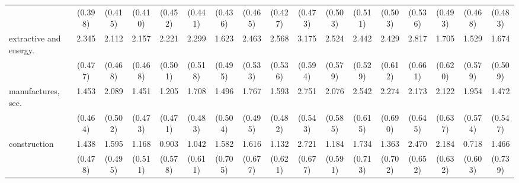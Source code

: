{\begin{tabular}{l*{16}{c}}
                    &     (0.398)         &     (0.415)         &     (0.410)         &     (0.452)         &     (0.441)         &     (0.436)         &     (0.465)         &     (0.427)         &     (0.473)         &     (0.503)         &     (0.511)         &     (0.503)         &     (0.536)         &     (0.493)         &     (0.468)         &     (0.483)         \\
[1em]
extractive and energy.&       2.345\sym{***}&       2.112\sym{***}&       2.157\sym{***}&       2.221\sym{***}&       2.299\sym{***}&       1.623\sym{**} &       2.463\sym{***}&       2.568\sym{***}&       3.175\sym{***}&       2.524\sym{***}&       2.442\sym{***}&       2.429\sym{***}&       2.817\sym{***}&       1.705\sym{**} &       1.529\sym{**} &       1.674\sym{**} \\
                    &     (0.477)         &     (0.468)         &     (0.468)         &     (0.501)         &     (0.518)         &     (0.495)         &     (0.533)         &     (0.536)         &     (0.594)         &     (0.579)         &     (0.529)         &     (0.612)         &     (0.661)         &     (0.620)         &     (0.579)         &     (0.509)         \\
[1em]
manufactures, sec.  &       1.453\sym{**} &       2.089\sym{***}&       1.451\sym{**} &       1.205\sym{*}  &       1.708\sym{***}&       1.496\sym{**} &       1.767\sym{***}&       1.593\sym{***}&       2.751\sym{***}&       2.076\sym{***}&       2.542\sym{***}&       2.274\sym{***}&       2.173\sym{***}&       2.122\sym{***}&       1.954\sym{***}&       1.472\sym{**} \\
                    &     (0.464)         &     (0.502)         &     (0.473)         &     (0.471)         &     (0.483)         &     (0.504)         &     (0.495)         &     (0.482)         &     (0.543)         &     (0.585)         &     (0.615)         &     (0.690)         &     (0.645)         &     (0.637)         &     (0.574)         &     (0.547)         \\
[1em]
construction        &       1.438\sym{**} &       1.595\sym{**} &       1.168\sym{*}  &       0.903         &       1.042         &       1.582\sym{*}  &       1.616\sym{*}  &       1.132         &       2.721\sym{***}&       1.184\sym{*}  &       1.734\sym{*}  &       1.363         &       2.470\sym{***}&       2.184\sym{***}&       0.718         &       1.466\sym{*}  \\
                    &     (0.478)         &     (0.495)         &     (0.511)         &     (0.578)         &     (0.611)         &     (0.705)         &     (0.677)         &     (0.621)         &     (0.677)         &     (0.591)         &     (0.713)         &     (0.702)         &     (0.652)         &     (0.632)         &     (0.603)         &     (0.739)         \\

\end{tabular}}

